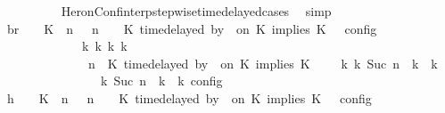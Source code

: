 \begin{isabellebody}
\ \ \ \ \ \ \ \ \isamarkupfalse%
\ HeronConf{\isacharunderscore}interp{\isacharunderscore}stepwise{\isacharunderscore}timedelayed{\isacharunderscore}cases\ \isamarkupfalse%
\ simp\isanewline
\ \ \ \ \ \ \isamarkupfalse%
\ \isamarkupfalse%
\ br{}{\isacharcolon}\ {\isacartoucheopen}{\isasymrho}\ {\isasymin}\ {\isasymlbrakk}\ {\isacharparenleft}{\isacharparenleft}K\ {\isasymnot}{\isasymUp}\ n{\isacharparenright}\ {\isacharhash}\ {\isasymGamma}{\isacharparenright}{\isacharcomma}\ n\ {\isasymturnstile}\ {\isasymPsi}\ {\isasymtriangleright}\ {\isacharparenleft}{\isacharparenleft}K\ time{\isacharminus}delayed\ by\ {\isasymdelta}{\isasymtau}\ on\ K\ implies\ K\ {\isacharhash}\ {\isasymPhi}{\isacharparenright}\ {\isasymrbrakk}\isactrlsub c\isactrlsub o\isactrlsub n\isactrlsub f\isactrlsub i\isactrlsub g\isanewline
\ \ \ \ \ \ \ \ \ \ \ \ {\isasymLongrightarrow}\ {\isasymexists}{\isasymGamma}\isactrlsub k\ {\isasymPsi}\isactrlsub k\ {\isasymPhi}\isactrlsub k\ k{\isachardot}\isanewline
\ \ \ \ \ \ \ \ \ \ \ \ \ {\isacharparenleft}{\isacharparenleft}{\isasymGamma}{\isacharcomma}\ n\ {\isasymturnstile}\ {\isacharparenleft}{\isacharparenleft}K\ time{\isacharminus}delayed\ by\ {\isasymdelta}{\isasymtau}\ on\ K\ implies\ K\ {\isacharhash}\ {\isasymPsi}{\isacharparenright}\ {\isasymtriangleright}\ {\isasymPhi}{\isacharparenright}\ {\isasymhookrightarrow}\isactrlbsup k\isactrlesup \ {\isacharparenleft}{\isasymGamma}\isactrlsub k{\isacharcomma}\ Suc\ n\ {\isasymturnstile}\ {\isasymPsi}\isactrlsub k\ {\isasymtriangleright}\ {\isasymPhi}\isactrlsub k{\isacharparenright}{\isacharparenright}\isanewline
\ \ \ \ \ \ \ \ \ \ \ \ {\isasymand}\ {\isasymrho}\ {\isasymin}\ {\isasymlbrakk}\ {\isasymGamma}\isactrlsub k{\isacharcomma}\ Suc\ n\ {\isasymturnstile}\ {\isasymPsi}\isactrlsub k\ {\isasymtriangleright}\ {\isasymPhi}\isactrlsub k\ {\isasymrbrakk}\isactrlsub c\isactrlsub o\isactrlsub n\isactrlsub f\isactrlsub i\isactrlsub g{\isacartoucheclose}\isanewline
\ \ \ \ \ \ \isamarkupfalse%
\ {\isacharminus}\isanewline
\ \ \ \ \ \ \ \ \isamarkupfalse%
\ h{}{\isacharcolon}\ {\isacartoucheopen}{\isasymrho}\ {\isasymin}\ {\isasymlbrakk}\ {\isacharparenleft}{\isacharparenleft}K\ {\isasymnot}{\isasymUp}\ n{\isacharparenright}\ {\isacharhash}\ {\isasymGamma}{\isacharparenright}{\isacharcomma}\ n\ {\isasymturnstile}\ {\isasymPsi}\ {\isasymtriangleright}\ {\isacharparenleft}{\isacharparenleft}K\ time{\isacharminus}delayed\ by\ {\isasymdelta}{\isasymtau}\ on\ K\ implies\ K\ {\isacharhash}\ {\isasymPhi}{\isacharparenright}\ {\isasymrbrakk}\isactrlsub c\isactrlsub o\isactrlsub n\isactrlsub f\isactrlsub i\isactrlsub g{\isacartoucheclose}\isanewline

\end{isabellebody}
